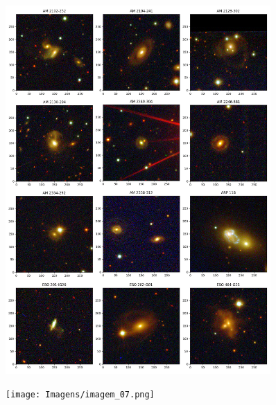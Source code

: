 \begin{anexosenv}
    \begin{figure}[h]
        \centering 
        \includegraphics[width=0.9\textwidth]{Imagens/imagem_06.png} 
        \caption[]{}
        \label{fig:imagem_06} 
    \end{figure}

    \begin{figure}[h]
        \centering 
        \texttt{[image: Imagens/imagem\_07.png]} 
        \caption[]{}
        \label{fig:imagem_07} 
    \end{figure}


\end{anexosenv}
